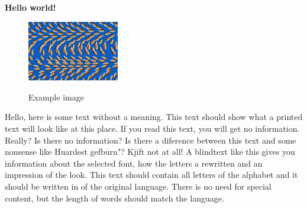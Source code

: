 \documentclass[crop=false]{standalone}
\begin{document}
\textbf{Hello world!}

\begin{figure}[hbtp]
    \centering
    \includegraphics[width=4cm]{example-image}
    \label{fig:img2}
    \caption{Example image}
\end{figure}

Hello, here is some text without a meaning.  This text should show what a printed text will look like at this place.  If you read this text, you will get no information.  Really?  Is there no information?  Is there a diference between this text and some nonsense like Huardest gefburn"?  Kjift  not at all!  A blindtext like this gives you information about the selected font, how the letters a rewritten and an impression of the look.  This text should contain all letters of the alphabet and it should be written in of the original language.  There is no need for special content, but the length of words should match the language.
\end{document}
